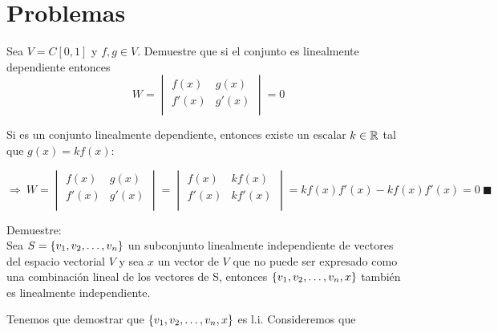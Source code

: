 \chapter{Problemas}

\begin{enumerate}

\begin{prob}
Sea $V=C[0,1]$ y $f, g \in V$. Demuestre que si el conjunto  es linealmente dependiente entonces
\[W=
\begin{vmatrix}
f(x)&g(x)\\
f'(x)&g'(x)\\
\end{vmatrix}=0
\]
\end{prob}
\sol
Si  es un conjunto linealmente dependiente, entonces existe un escalar $k\in \mathbb{R}$ tal que $g(x)=kf(x)$:

\[\Rightarrow\
W=
\begin{vmatrix}
f(x)&g(x)\\
f'(x)&g'(x)\\
\end{vmatrix}
=
\begin{vmatrix}
f(x)&kf(x)\\
f'(x)&kf'(x)\\
\end{vmatrix}
=
kf(x)f'(x)-kf(x)f'(x)=0
\ \blacksquare\]

\begin{prob}
Demuestre:
\\Sea $S= \lbrace v_1, v_2, \ldots, v_n \rbrace$ un subconjunto linealmente independiente de vectores del espacio vectorial $V$ y sea $x$ un vector de $V$ que no puede ser expresado como una combinación lineal de los vectores de S, entonces $ \left\{ v_1, v_2, \ldots, v_n, x \right\} $
también es linealmente independiente.
\end{prob}

\sol
Tenemos que demostrar que $ \left\{ v_1, v_2, \ldots, v_n, x \right\} $ es l.i.
Consideremos que


\end{enumerate}
